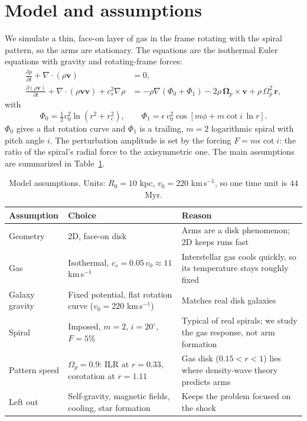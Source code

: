 \documentclass[11pt]{article}
\begin{document}
\section{Model and assumptions}
We simulate a thin, face-on layer of gas in the frame rotating with the spiral pattern, so the arms are stationary. The equations are the isothermal Euler equations with gravity and rotating-frame forces:
\begin{align}
\frac{\partial\rho}{\partial t}+\nabla\cdot(\rho\mathbf{v}) &= 0,\\
\frac{\partial(\rho\mathbf{v})}{\partial t}+\nabla\cdot(\rho\mathbf{v}\mathbf{v})+c_s^2\nabla\rho &= -\rho\nabla(\Phi_0+\Phi_1)-2\rho\,\boldsymbol{\Omega}_p\times\mathbf{v}+\rho\,\Omega_p^2\,\mathbf{r},
\end{align}
with
\begin{equation}
\Phi_0=\tfrac12 v_0^2\ln(r^2+r_c^2),\qquad
\Phi_1=\epsilon\,v_0^2\cos\!\left[m\phi+m\cot i\,\ln r\right].
\end{equation}
$\Phi_0$ gives a flat rotation curve and $\Phi_1$ is a trailing, $m=2$ logarithmic spiral with pitch angle $i$. The perturbation amplitude is set by the forcing $F=m\epsilon\cot i$: the ratio of the spiral's radial force to the axisymmetric one. The main assumptions are summarized in Table~\ref{tab:assump}.

\begin{table}[H]
\centering\small
\begin{tabularx}{\textwidth}{@{}l l X@{}}
\toprule
Assumption & Choice & Reason \\
\midrule
Geometry & 2D, face-on disk & Arms are a disk phenomenon; 2D keeps runs fast \\
Gas & Isothermal, $c_s=0.05\,v_0\approx11$ km\,s$^{-1}$ & Interstellar gas cools quickly, so its temperature stays roughly fixed \\
Galaxy gravity & Fixed potential, flat rotation curve ($v_0=220$ km\,s$^{-1}$) & Matches real disk galaxies \\
Spiral & Imposed, $m=2$, $i=20^\circ$, $F=5\%$ & Typical of real spirals; we study the gas response, not arm formation \\
Pattern speed & $\Omega_p=0.9$: ILR at $r=0.33$, corotation at $r=1.11$ & Gas disk ($0.15<r<1$) lies where density-wave theory predicts arms \\
Left out & Self-gravity, magnetic fields, cooling, star formation & Keeps the problem focused on the shock \\
\bottomrule
\end{tabularx}
\caption{Model assumptions. Units: $R_0=10$ kpc, $v_0=220$ km\,s$^{-1}$, so one time unit is $44$ Myr.}
\label{tab:assump}
\end{table}
\end{document}

